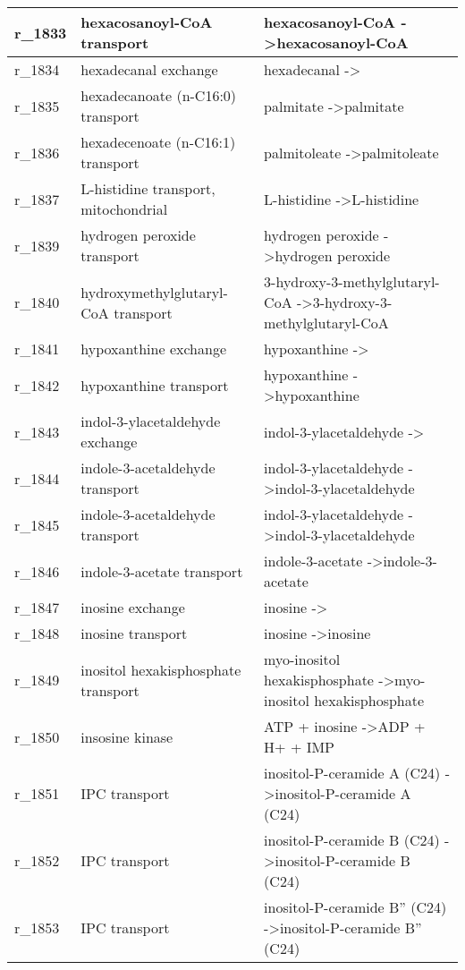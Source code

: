 \begin{landscape}
{\begin{longtable}{|l|p{7cm}|p{15cm}|}
r\_1833 & hexacosanoyl-CoA transport & hexacosanoyl-CoA  -\textgreater hexacosanoyl-CoA \\ \hline
r\_1834 & hexadecanal exchange & hexadecanal  -\textgreater{} \\ \hline
r\_1835 & hexadecanoate (n-C16:0) transport & palmitate  -\textgreater palmitate \\ \hline
r\_1836 & hexadecenoate (n-C16:1) transport & palmitoleate  -\textgreater palmitoleate \\ \hline
r\_1837 & L-histidine transport, mitochondrial & L-histidine  -\textgreater L-histidine \\ \hline
r\_1839 & hydrogen peroxide transport & hydrogen peroxide  -\textgreater hydrogen peroxide \\ \hline
r\_1840 & hydroxymethylglutaryl-CoA transport & 3-hydroxy-3-methylglutaryl-CoA  -\textgreater 3-hydroxy-3-methylglutaryl-CoA \\ \hline
r\_1841 & hypoxanthine exchange & hypoxanthine  -\textgreater{} \\ \hline
r\_1842 & hypoxanthine transport & hypoxanthine  -\textgreater hypoxanthine \\ \hline
r\_1843 & indol-3-ylacetaldehyde exchange & indol-3-ylacetaldehyde  -\textgreater{} \\ \hline
r\_1844 & indole-3-acetaldehyde transport & indol-3-ylacetaldehyde  -\textgreater indol-3-ylacetaldehyde \\ \hline
r\_1845 & indole-3-acetaldehyde transport & indol-3-ylacetaldehyde  -\textgreater indol-3-ylacetaldehyde \\ \hline
r\_1846 & indole-3-acetate transport & indole-3-acetate  -\textgreater indole-3-acetate \\ \hline
r\_1847 & inosine exchange & inosine  -\textgreater{} \\ \hline
r\_1848 & inosine transport & inosine  -\textgreater inosine \\ \hline
r\_1849 & inositol hexakisphosphate transport & myo-inositol hexakisphosphate  -\textgreater myo-inositol hexakisphosphate \\ \hline
r\_1850 & insosine kinase & ATP + inosine  -\textgreater ADP + H+ + IMP \\ \hline
r\_1851 & IPC transport & inositol-P-ceramide A (C24)  -\textgreater inositol-P-ceramide A (C24) \\ \hline
r\_1852 & IPC transport & inositol-P-ceramide B (C24)  -\textgreater inositol-P-ceramide B (C24) \\ \hline
r\_1853 & IPC transport & inositol-P-ceramide B'' (C24)  -\textgreater inositol-P-ceramide B'' (C24) \\ \hline

\end{longtable}}
\end{landscape}
